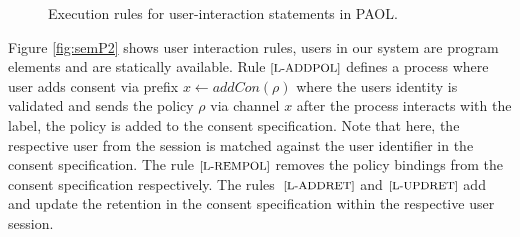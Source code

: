 \begin{figure*}[t]
\centering 
{}
\caption{ \label{fig:semP3} 
 Execution rules for user-interaction statements in
 PAOL.}
\end{figure*}

Figure \ref{fig:semP2} shows user interaction rules, users in our system are program elements and are statically available. Rule $\scriptsize \text{[L-ADDPOL]}$ defines a process where user adds consent via prefix $ x \leftarrow addCon(\rho)$ where the users identity is validated and sends the policy $ \rho$ via channel $ x$ after the process interacts with the label, the policy is added to the consent specification. Note that here, the respective user from the session is matched against the user identifier in the consent specification.
 The rule $ \scriptsize \text{[L-REMPOL]}$ removes the policy bindings from the consent specification respectively.
 The rules $\scriptsize  \text{ [L-ADDRET]}$ and $ \scriptsize  \text{[L-UPDRET]}$ add and update the retention in the consent specification within the respective user session. 
 

